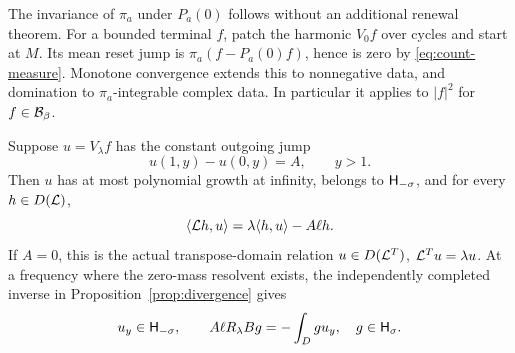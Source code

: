 The invariance of $\pi_a$ under $P_a(0)$ follows without an additional
renewal theorem. For a bounded terminal $f$, patch the harmonic
$V_0f$ over cycles and start at $M$. Its mean reset jump is
$\pi_a(f-P_a(0)f)$, hence is zero by \eqref{eq:count-measure}.
Monotone convergence extends this to nonnegative data, and domination
to $\pi_a$-integrable complex data. In particular it applies to $|f|^2$
for $f\in\mathcal B_\beta$.

\begin{proposition}\label{prop:constant-jump}
Suppose $u=V_\lambda f$ has the constant outgoing jump
\begin{equation}\label{eq:constant-jump}
 u(1,y)-u(0,y)=A,\qquad y>1.
\end{equation}
Then $u$ has at most polynomial growth at infinity, belongs to
$\mathsf H_{-\sigma}$, and for every $h\in D(\mathcal L)$,
\begin{equation}\label{eq:generator-pairing}
 \langle\mathcal L h,u\rangle=\lambda\langle h,u\rangle-A\ell h.
\end{equation}
If $A=0$, this is the actual transpose-domain relation
$u\in D(\mathcal L^T)$, $\mathcal L^Tu=\lambda u$. At a frequency where the
zero-mass resolvent exists, the independently completed inverse in
Proposition~\ref{prop:divergence} gives
\begin{equation}\label{eq:divergence-pairing}
 u_y\in\mathsf H_{-\sigma},\qquad
 A\ell R_\lambda Bg=-\int_Dg u_y,\quad g\in\mathsf H_\sigma.
\end{equation}
\end{proposition}


